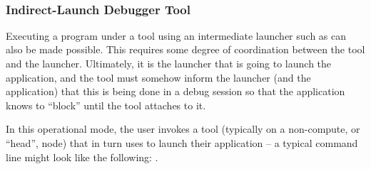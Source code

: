 
{\large {}}

{\large {}}

{\large {}}

{\large {}}

{\large {}}

{\large {}}




 \\

\subsubsection{Indirect-Launch Debugger Tool}

Executing a program under a tool using an intermediate launcher such as  can also be made possible. This requires some degree of coordination between the tool and the launcher. Ultimately, it is the launcher that is going to launch the application, and the tool must somehow inform the launcher (and the application) that this is being done in a debug session so that the application knows to ``block'' until the tool attaches to it.

In this operational mode, the user invokes a tool (typically on a non-compute, or ``head'', node) that in turn uses  to launch their application – a typical command line might look like the following: .

